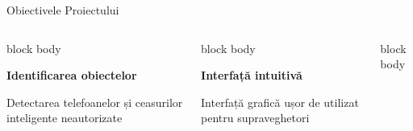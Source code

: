 \documentclass[aspectratio=169,9pt]{beamer}
\begin{document}
\begin{frame}{Obiectivele Proiectului}
\begin{columns}[T]
                        \begin{beamercolorbox}[rounded=true,shadow=true,sep=1em]{block body}
                                \begin{center}
                                        {\fontsize{24}{24}\selectfont\textcolor{mainblue}{\faMobile}}
                                        \vspace{0.2cm}
                                        
                                        \textbf{Identificarea obiectelor}
                                        \vspace{0.1cm}
                                        
                                        \small Detectarea telefoanelor și ceasurilor inteligente neautorizate
                                \end{center}
                        \end{beamercolorbox}
                        
                        \vspace{0.3cm}
                        
                        \begin{beamercolorbox}[rounded=true,shadow=true,sep=1em]{block body}
                                \begin{center}
                                        {\fontsize{24}{24}\selectfont\textcolor{mainblue}{\faCog}}
                                        \vspace{0.2cm}
                                        
                                        \textbf{Interfață intuitivă}
                                        \vspace{0.1cm}
                                        
                                        \small Interfață grafică ușor de utilizat pentru supraveghetori
                                \end{center}
                        \end{beamercolorbox}
                        
                        \begin{beamercolorbox}[rounded=true,shadow=true,sep=1em]{block body}
                                \begin{center}
                                        {\fontsize{24}{24}\selectfont\textcolor{mainblue}{\faVideo}}
                                        \vspace{0.2cm}
                                        

\end{center}
\end{beamercolorbox}
\end{columns}
\end{frame}
\end{document}
